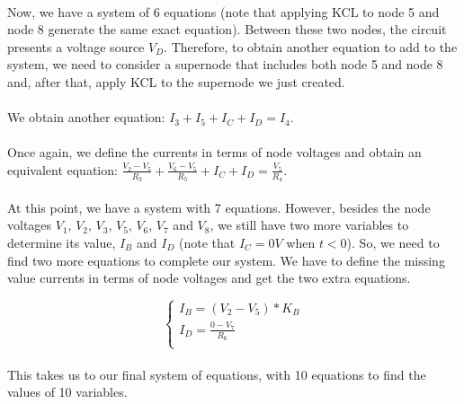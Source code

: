 \paragraph{}
Now, we have a system of 6 equations (note that applying KCL to node 5 and node 8 generate the same exact equation). Between these two nodes, the circuit presents a voltage source $V_D$. Therefore, to obtain another equation to add to the system, we need to consider a supernode that includes both node 5 and node 8 and, after that, apply KCL to the supernode we just created.

\paragraph{}
We obtain another equation: $ I_3 + I_5 + I_C + I_D = I_4 $.

\paragraph{}
Once again, we define the currents in terms of node voltages and obtain an equivalent equation: $ \frac{V_2-V_5}{R_3}+\frac{V_6-V_5}{R_5} + I_C + I_D = \frac{V_5}{R_4} $.

\paragraph{}
At this point, we have a system with 7 equations. However, besides the node voltages $V_1$, $V_2$, $V_3$, $V_5$, $V_6$, $V_7$ and $V_8$, we still have two more variables to determine its value, $I_B$ and $I_D$ (note that $I_C = 0 V $ when $t < 0$). So, we need to find two more equations to complete our system. We have to define the missing value currents in terms of node voltages and get the two extra equations.

\[
\left\{\begin{matrix}
I_B = (V_2-V_5)*K_B \\
I_D = \frac{0-V_7}{R_6} \\
\end{matrix}\right.
\]

\paragraph{}
This takes us to our final system of equations, with 10 equations to find the values of 10 variables.

